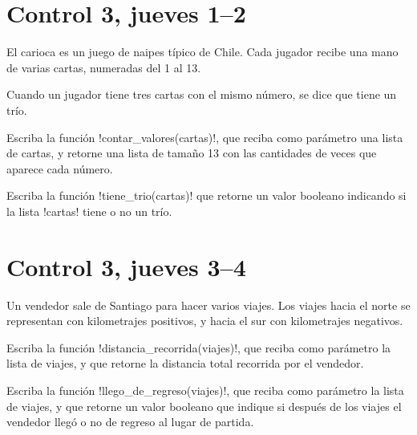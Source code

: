 \documentclass[12pt,spanish,a5paper,landscape]{article}
\begin{document}
  \newpage
  \part*{Control 3, jueves 1--2}
  \newpage
  El carioca es un juego de naipes típico de Chile.
  Cada jugador recibe una mano de varias cartas,
  numeradas del 1 al 13.

  Cuando un jugador tiene tres cartas con el mismo número,
  se dice que tiene un trío.

  Escriba la función \li!contar_valores(cartas)!,
  que reciba como parámetro una lista de cartas,
  y retorne una lista de tamaño 13
  con las cantidades de veces que aparece cada número.

  Escriba la función \li!tiene_trio(cartas)!
  que retorne un valor booleano
  indicando si la lista \li!cartas! tiene o no un trío.

  

  \newpage
  \part*{Control 3, jueves 3--4}
  \newpage

  Un vendedor sale de Santiago
  para hacer varios viajes.
  Los viajes hacia el norte
  se representan con kilometrajes positivos,
  y hacia el sur con kilometrajes negativos.

  Escriba la función \li!distancia_recorrida(viajes)!,
  que reciba como parámetro la lista de viajes,
  y que retorne la distancia total recorrida por el vendedor.

  Escriba la función \li!llego_de_regreso(viajes)!,
  que reciba como parámetro la lista de viajes,
  y que retorne un valor booleano
  que indique si después de los viajes
  el vendedor llegó o no de regreso al lugar de partida.

  
\end{document}
